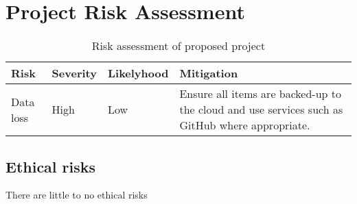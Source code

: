 \section{Project Risk Assessment}

\begin{table}[hbt!]
    \centering%
        \begin{tabularx}{\textwidth}{ lllX }
            \hline
            Risk       & Severity & Likelyhood & Mitigation  \\ \hline

            Data loss & High & Low & Ensure all items are backed-up to the cloud and use services such as GitHub where appropriate. \\
    
            \hline
            \end{tabularx}
    \caption{ Risk assessment of proposed project}\label{table:milestones}
    \end{table}
     

\subsection{Ethical risks}
There are little to no ethical risks
